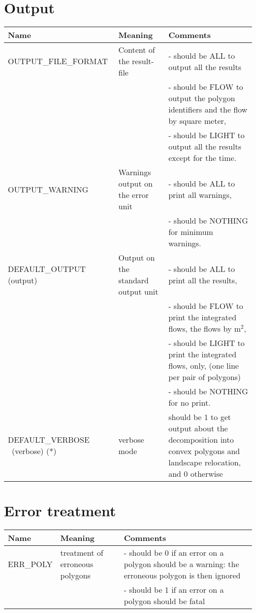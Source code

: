 \section{Output}
\begin{tabular}[h]{|p{5cm}|p{5cm}|p{5cm}|}
\hline
\textbf{Name} & \textbf{Meaning} & \textbf{Comments}  \\ \hline
OUTPUT\_FILE\_FORMAT &
Content of the result-file  &
- should be ALL to output all the results \\ 
& &
- should be FLOW  to output  the polygon identifiers and the flow by
square meter,\\
& &
- should be LIGHT  to output all the results  except for the time.
 \\ \hline
OUTPUT\_WARNING &
Warnings output on the error unit &
- should be ALL to print all warnings,
\\
& &
- should be NOTHING for minimum  warnings.
 \\ \hline
DEFAULT\_OUTPUT  \mbox{(output)} &
Output on the standard output unit &
- should be ALL to print all the results,\\
& &
- should be FLOW to print the integrated flows,
the flows by m$^2$,
\\
& &
- should be LIGHT to print the integrated flows, only, (one line per pair of polygons)\\
& &
- should be NOTHING for no print.
 \\ \hline
DEFAULT\_VERBOSE  \mbox{ (verbose)} \mbox{(*)} &
verbose mode &
 should be 1 to get output about the decomposition into convex polygons
and landscape relocation,   and
 0 otherwise \\ \hline
\end{tabular}

\section{Error treatment}
\begin{tabular}[h]{|p{5cm}|p{5cm}|p{5cm}|}
\hline
\textbf{Name} & \textbf{Meaning} & \textbf{Comments}  \\ \hline
ERR\_POLY &
treatment of erroneous polygons &
- should be 0 if an error on a polygon should be a warning:
   the erroneous polygon is then ignored \\ 
& &
- should be 1 if an error on a  polygon should be fatal \\ \hline
\end{tabular}


